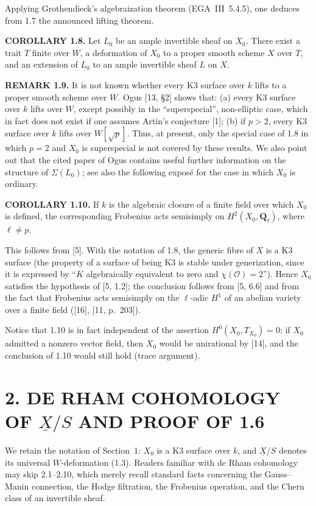 \documentclass[10pt]{article}
\newcommand{\UX}{\underline{X}}
\begin{document}
Applying Grothendieck's algebraization theorem (EGA~III~5.4.5), one deduces from 1.7 the announced lifting theorem.

\noindent\textbf{COROLLARY 1.8.} Let $L_0$ be an ample invertible sheaf on $X_0$. There exist a trait $T$ finite over $W$, a deformation of $X_0$ to a proper smooth scheme $X$ over $T$, and an extension of $L_0$ to an ample invertible sheaf $L$ on $X$.

\noindent\textbf{REMARK 1.9.} It is not known whether every K3 surface over $k$ lifts to a proper smooth scheme over $W$. Ogus [13, \S2] shows that: (a) every K3 surface over $k$ lifts over $W$, except possibly in the ``superspecial'', non-elliptic case, which in fact does not exist if one assumes Artin's conjecture [1]; (b) if $p>2$, every K3 surface over $k$ lifts over $W[\sqrt p]$. Thus, at present, only the special case of 1.8 in which $p=2$ and $X_0$ is superspecial is not covered by these results. We also point out that the cited paper of Ogus contains useful further information on the structure of $\Sigma(L_0)$; see also the following exposé for the case in which $X_0$ is ordinary.

\noindent\textbf{COROLLARY 1.10.} If $k$ is the algebraic closure of a finite field over which $X_0$ is defined, the corresponding Frobenius acts semisimply on $H^2(X_0,\mathbf Q_\ell)$, where $\ell\ne p$.
\newpage
\setcounter{footnote}{0}
\fontsize{10.2pt}{12.04pt}\selectfont

This follows from [5]. With the notation of 1.8, the generic fibre of $X$ is a K3 surface (the property of a surface of being K3 is stable under generization, since it is expressed by ``$K$ algebraically equivalent to zero and $\chi(\mathcal O)=2$''). Hence $X_0$ satisfies the hypothesis of [5, 1.2]; the conclusion follows from [5, 6.6] and from the fact that Frobenius acts semisimply on the $\ell$-adic $H^1$ of an abelian variety over a finite field ([16], [11, p.~203]).

Notice that 1.10 is in fact independent of the assertion $H^0(X_0,T_{X_0})=0$: if $X_0$ admitted a nonzero vector field, then $X_0$ would be unirational by [14], and the conclusion of 1.10 would still hold (trace argument).

\section*{2. DE RHAM COHOMOLOGY OF $\UX/S$ AND PROOF OF 1.6}
We retain the notation of Section~1: $X_0$ is a K3 surface over $k$, and $\UX/S$ denotes its universal $W$-deformation (1.3). Readers familiar with de Rham cohomology may skip 2.1--2.10, which merely recall standard facts concerning the Gauss--Manin connection, the Hodge filtration, the Frobenius operation, and the Chern class of an invertible sheaf.
\end{document}
